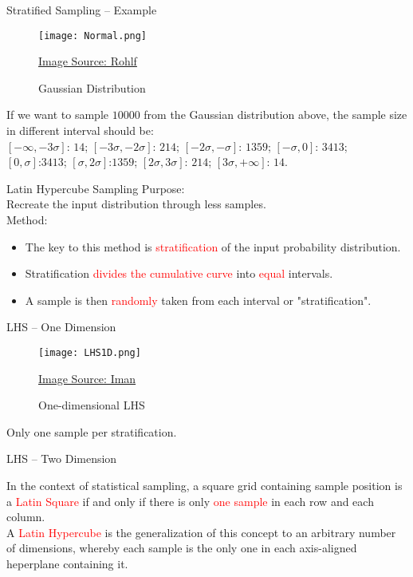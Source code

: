 \begin{frame}{Stratified Sampling -- Example}

\begin{figure}[ht]
		  \centering
          \texttt{[image: Normal.png]}
           \caption{Gaussian Distribution}
           \href{http://hyperphysics.phy-astr.gsu.edu/hbase/Math/gaufcn.html}{Image Source: Rohlf}
 \end{figure}
 
 If we want to sample $10000$ from the Gaussian distribution above, the sample size in different interval should be:\\
 $[-\infty, -3\sigma]$: $14$; $[-3\sigma, -2\sigma]$: $214$; $[-2\sigma,-\sigma]$: $1359$; $[-\sigma,0]$: $3413$;\\
 $[0,\sigma]$:$3413$; $[\sigma,2\sigma]$:$1359$; $[2\sigma,3\sigma]$: $214$; $[3\sigma, +\infty]$: $14$.
 
 \end{frame}

\begin{frame}{Latin Hypercube Sampling}
Purpose:\\
Recreate the input distribution through less samples.\\
Method:\\
\begin{itemize}
\item The key to this method is \textcolor{red}{stratification} of the input probability distribution.
\item Stratification \textcolor{red}{divides the cumulative curve} into \textcolor{red}{equal} intervals.
\item A sample is then \textcolor{red}{randomly} taken from each interval or "stratification".
\end{itemize}
\end{frame}

\begin{frame}{LHS -- One Dimension}
\begin{figure}[ht]
		  \centering
          \texttt{[image: LHS1D.png]}
           \caption{One-dimensional LHS}
           \href{https://www.youtube.com/watch?v=H0RZ1uezuuw}{Image Source: Iman}
 \end{figure}
 Only one sample per stratification.
\end{frame}

\begin{frame}{LHS -- Two Dimension}

 In the context of statistical sampling, a square grid containing sample position is a \textcolor{red}{Latin Square} if and only if there is only \textcolor{red}{one sample} in each row and each column.\\
 A \textcolor{red}{Latin Hypercube} is the generalization of this concept to an arbitrary number of dimensions, whereby each sample is the only one in each axis-aligned heperplane containing it.
 
\end{frame}

